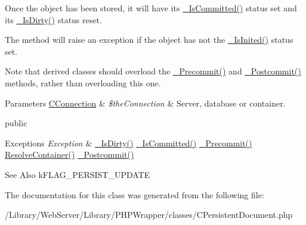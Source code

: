 Once the object has been stored, it will have its \hyperlink{class_c_status_document_ab7d96fd4588cf7d5432fc65a1d1fb076}{\-\_\-\-Is\-Committed()} status set and its \hyperlink{class_c_status_document_ad5193995e1bff6de09acf3248a232ef9}{\-\_\-\-Is\-Dirty()} status reset.

The method will raise an exception if the object has not the \hyperlink{class_c_status_document_a954dee06e219e0a0f2e7fa6edac56e28}{\-\_\-\-Is\-Inited()} status set.

Note that derived classes should overload the \hyperlink{class_c_persistent_document_a23cfbb5ebf75e008622ab9e723472c70}{\-\_\-\-Precommit()} and \hyperlink{class_c_persistent_document_aa7fdfe47ee3099ebda49a76e1fa24670}{\-\_\-\-Postcommit()} methods, rather than overloading this one.


\begin{DoxyParams}[1]{Parameters}
\hyperlink{class_c_connection}{C\-Connection} & {\em \$the\-Connection} & Server, database or container.\\
\hline
\end{DoxyParams}
public


\begin{DoxyExceptions}{Exceptions}
{\em Exception} & \hyperlink{class_c_status_document_ad5193995e1bff6de09acf3248a232ef9}{\-\_\-\-Is\-Dirty()}  \hyperlink{class_c_status_document_ab7d96fd4588cf7d5432fc65a1d1fb076}{\-\_\-\-Is\-Committed()}  \hyperlink{class_c_persistent_document_a23cfbb5ebf75e008622ab9e723472c70}{\-\_\-\-Precommit()}  \hyperlink{class_c_persistent_document_a4dbe287aa3b46bdc0a1157e001078589}{Resolve\-Container()}  \hyperlink{class_c_persistent_document_aa7fdfe47ee3099ebda49a76e1fa24670}{\-\_\-\-Postcommit()}\\
\hline
\end{DoxyExceptions}
\begin{DoxySeeAlso}{See Also}
k\-F\-L\-A\-G\-\_\-\-P\-E\-R\-S\-I\-S\-T\-\_\-\-U\-P\-D\-A\-T\-E 
\end{DoxySeeAlso}


The documentation for this class was generated from the following file\-:\begin{DoxyCompactItemize}
\item 
/\-Library/\-Web\-Server/\-Library/\-P\-H\-P\-Wrapper/classes/C\-Persistent\-Document.\-php\end{DoxyCompactItemize}

